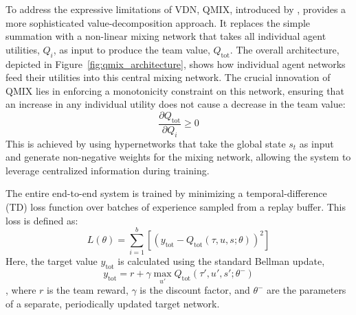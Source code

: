 
   

To address the expressive limitations of VDN, QMIX, introduced by  \parencite{QMIX}, provides a more sophisticated value-decomposition approach. It replaces the simple summation with a non-linear mixing network that takes all individual agent utilities, $Q_i$, as input to produce the team value, $Q_{\text{tot}}$. The overall architecture, depicted in Figure~\ref{fig:qmix_architecture}, shows how individual agent networks feed their utilities into this central mixing network. The crucial innovation of QMIX lies in enforcing a monotonicity constraint on this network, ensuring that an increase in any individual utility does not cause a decrease in the team value:
\begin{equation*}
    \frac{\partial Q_{\text{tot}}}{\partial Q_i} \geq 0
\end{equation*}
This is achieved by using hypernetworks that take the global state $s_t$ as input and generate non-negative weights for the mixing network, allowing the system to leverage centralized information during training.

The entire end-to-end system is trained by minimizing a temporal-difference (TD) loss function over batches of experience sampled from a replay buffer. This loss is defined as:
\begin{equation}
    \label{eq:qmix_loss}
    L(\theta) = \sum_{i=1}^{b} \left[ \left(y_{\text{tot}} - Q_{\text{tot}}(\tau, u, s; \theta)\right)^2 \right]
\end{equation}
Here, the target value $y_{\text{tot}}$ is calculated using the standard Bellman update,\begin{equation*}
    y_{\text{tot}} = r + \gamma \max_{u'} Q_{\text{tot}}(\tau', u', s'; \theta^{-})
\end{equation*}
, where $r$ is the team reward, $\gamma$ is the discount factor, and $\theta^{-}$ are the parameters of a separate, periodically updated target network.

